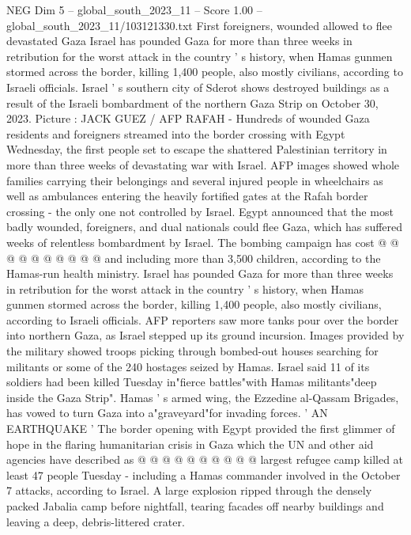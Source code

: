 \begin{textsample}{NEG Dim 5 – global\_south\_2023\_11 – Score 1.00 – global\_south\_2023\_11/103121330.txt}  \label{ex:f5_neg_176}
First foreigners, wounded allowed to flee devastated Gaza Israel has pounded Gaza for more than three weeks in retribution for the worst attack in the country ' s history, when Hamas gunmen stormed across the border, killing 1,400 people, also mostly civilians, according to Israeli officials.
Israel ' s southern city of Sderot shows destroyed buildings as a result of the Israeli bombardment of the northern Gaza Strip on October 30, 2023.
Picture : JACK GUEZ / AFP RAFAH - Hundreds of wounded Gaza residents and foreigners streamed into the border crossing with Egypt Wednesday, the first people set to escape the shattered Palestinian territory in more than three weeks of devastating war with Israel.
AFP images showed whole families carrying their belongings and several injured people in wheelchairs as well as ambulances entering the heavily fortified gates at the Rafah border crossing - the only one not controlled by Israel.
Egypt announced that the most badly wounded, foreigners, and dual nationals could flee Gaza, which has suffered weeks of relentless bombardment by Israel.
The bombing campaign has cost @ @ @ @ @ @ @ @ @ @ and including more than 3,500 children, according to the Hamas-run health ministry.
Israel has pounded Gaza for more than three weeks in retribution for the worst attack in the country ' s history, when Hamas gunmen stormed across the border, killing 1,400 people, also mostly civilians, according to Israeli officials.
AFP reporters saw more tanks pour over the border into northern Gaza, as Israel stepped up its ground incursion.
Images provided by the military showed troops picking through bombed-out houses searching for militants or some of the 240 hostages seized by Hamas.
Israel said 11 of its soldiers had been killed Tuesday in"fierce battles"with Hamas militants"deep inside the Gaza Strip".
Hamas ' s armed wing, the Ezzedine al-Qassam Brigades, has vowed to turn Gaza into a"graveyard"for invading forces. ' AN EARTHQUAKE ' The border opening with Egypt provided the first glimmer of hope in the flaring humanitarian crisis in Gaza which the UN and other aid agencies have described as @ @ @ @ @ @ @ @ @ @ largest refugee camp killed at least 47 people Tuesday - including a Hamas commander involved in the October 7 attacks, according to Israel.
A large explosion ripped through the densely packed Jabalia camp before nightfall, tearing facades off nearby buildings and leaving a deep, debris-littered crater.

\end{textsample}

